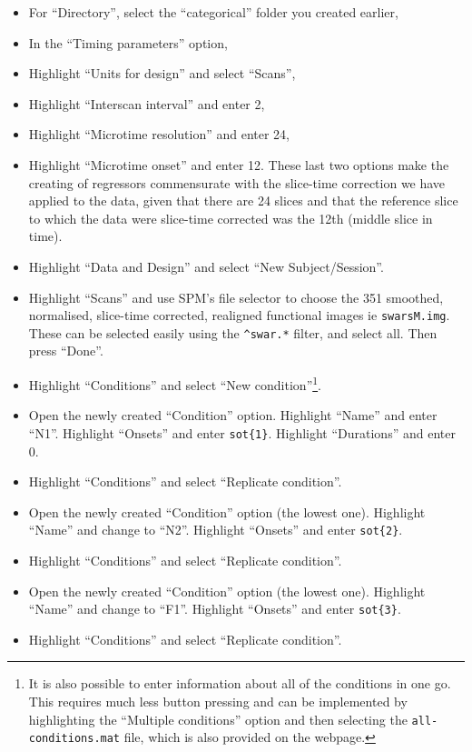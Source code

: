 \begin{itemize}
\item For ``Directory'', select the ``categorical'' folder you created earlier,
\item In the ``Timing parameters'' option,
\item Highlight ``Units for design'' and select ``Scans'',
\item Highlight ``Interscan interval'' and enter 2,
\item Highlight ``Microtime resolution'' and enter 24,
\item Highlight ``Microtime onset'' and enter 12. These last two options make the creating of regressors commensurate with the slice-time correction we have applied to the data, given that there are 24 slices and that the reference slice to which the data were slice-time corrected was the 12th (middle slice in time).
\item Highlight ``Data and Design'' and select ``New Subject/Session''.
\item Highlight ``Scans'' and use SPM's file selector to choose the 351 smoothed, normalised, slice-time corrected, realigned functional images ie \texttt{swarsM.img}. These can be selected easily using the \texttt{\textasciicircum swar.*} filter, and select all. Then press ``Done''.
\item Highlight ``Conditions'' and select ``New condition''\footnote{It is also possible to enter information about all of the conditions in one go. This requires much less button pressing and can be implemented by highlighting the ``Multiple conditions'' option and then selecting the \texttt{all-conditions.mat} file, which is also provided on the webpage.}.
\item Open the newly created ``Condition'' option. Highlight ``Name'' and enter ``N1''. Highlight ``Onsets'' and enter \texttt{sot\{1\}}. Highlight ``Durations'' and enter 0.
\item Highlight ``Conditions'' and select ``Replicate condition''.
\item Open the newly created ``Condition'' option (the lowest one). Highlight ``Name'' and change to ``N2''. Highlight ``Onsets'' and enter \texttt{sot\{2\}}.
\item Highlight ``Conditions'' and select ``Replicate condition''.
\item Open the newly created ``Condition'' option (the lowest one). Highlight ``Name'' and change to ``F1''. Highlight ``Onsets'' and enter \texttt{sot\{3\}}.
\item Highlight ``Conditions'' and select ``Replicate condition''.

\end{itemize}

